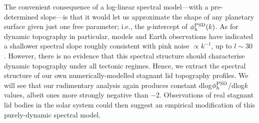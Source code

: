 The convenient consequence of a log-linear spectral model---with a pre-determined slope---is that it would let us approximate the shape of any planetary surface given just one free parameter; i.e., the $y$-intercept of $\phi^{\rm PSD}_h(k)$. %
As for dynamic topography in particular, models and Earth observations have indicated a shallower spectral slope roughly consistent with pink noise $\propto k^{-1}$, up to $l\sim30$ \citep{hoggard_global_2016, hoggard_oceanic_2017, davies_earth_2019}. However, there is no evidence that this spectral structure should characterise dynamic topography under all tectonic regimes. Hence, we extract the spectral structure of our own numerically-modelled stagnant lid topography profiles. We will see that our rudimentary analysis again produces constant dlog$\phi^{\rm PSD}_h$/dlog$k$ values, albeit ones more strongly negative than $-$2. Observations of real stagnant lid bodies in the solar system could then suggest an empirical modification of this purely-dynamic spectral model. 









